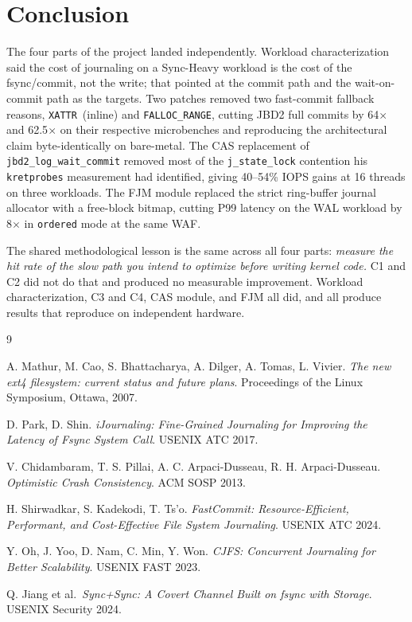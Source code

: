 \documentclass[12pt,a4paper]{article}
\begin{document}
\section{Conclusion}

The four parts of the project landed independently. Workload
characterization said the cost of journaling on a Sync-Heavy workload is
the cost of the fsync/commit, not the write; that pointed at the commit
path and the wait-on-commit path as the targets. Two
patches removed two fast-commit fallback reasons,
\texttt{XATTR}~(inline) and \texttt{FALLOC\_RANGE}, cutting JBD2
full commits by 64$\times$ and 62.5$\times$ on their respective
microbenches and reproducing the architectural claim
byte-identically on bare-metal. The CAS replacement of
\texttt{jbd2\_log\_wait\_commit} removed most of the
\texttt{j\_state\_lock} contention his \texttt{kretprobes}
measurement had identified, giving 40--54\% IOPS gains at 16
threads on three workloads. The FJM module replaced the
strict ring-buffer journal allocator with a free-block bitmap,
cutting P99 latency on the WAL workload by 8$\times$ in
\texttt{ordered} mode at the same WAF.

The shared methodological lesson is the same across all four
parts: \emph{measure the hit rate of the slow path you intend to
optimize before writing kernel code.}  C1 and C2 did
not do that and produced no measurable improvement. Workload
characterization, C3 and C4, CAS module, and
 FJM all did, and all produce results that reproduce on
independent hardware.

\begin{thebibliography}{9}

A. Mathur, M. Cao, S. Bhattacharya, A. Dilger, A. Tomas, L. Vivier.
\textit{The new ext4 filesystem: current status and future plans}.
Proceedings of the Linux Symposium, Ottawa, 2007.

D. Park, D. Shin.
\textit{iJournaling: Fine-Grained Journaling for Improving the
Latency of Fsync System Call}. USENIX ATC 2017.

V. Chidambaram, T. S. Pillai, A. C. Arpaci-Dusseau, R. H.
Arpaci-Dusseau. \textit{Optimistic Crash Consistency}. ACM SOSP 2013.

H. Shirwadkar, S. Kadekodi, T. Ts'o.
\textit{FastCommit: Resource-Efficient, Performant, and
Cost-Effective File System Journaling}. USENIX ATC 2024.

Y. Oh, J. Yoo, D. Nam, C. Min, Y. Won.
\textit{CJFS: Concurrent Journaling for Better Scalability}.
USENIX FAST 2023.

Q. Jiang et al.\
\textit{Sync+Sync: A Covert Channel Built on fsync with Storage}.
USENIX Security 2024.

\end{thebibliography}
\end{document}
